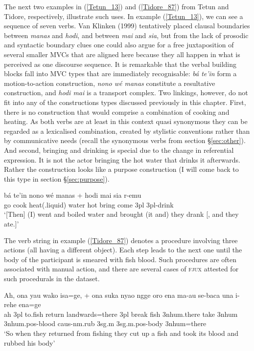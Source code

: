The next two examples in (\ref{Tetun_13}) and (\ref{Tidore_87}) from Tetun and Tidore, respectively, illustrate such uses. In example (\ref{Tetun_13}), we can see a sequence of seven verbs. Van Klinken (1999) tentatively placed clausal boundaries between \textit{manas} and \textit{hodi}, and between \textit{mai} and \textit{sia}, but from the lack of prosodic and syntactic boundary clues one could also argue for a free juxtaposition of several smaller MVCs that are aligned here because they all happen in what is perceived as one discourse sequence. It is remarkable that the verbal building blocks fall into MVC types that are immediately recognisable: \textit{bá te'in} form a motion-to-action construction, \textit{nono wé manas} constitute a resultative construction, and \textit{hodi mai} is a transport complex. Two linkings, however, do not fit into any of the constructions types discussed previously in this chapter. First, there is no construction that would comprise a combination of cooking and heating. As both verbs are at least in this context quasi synonymous they can be regarded as a lexicalised combination, created by stylistic conventions rather than by communicative needs (recall the synonymous verbs from section §\ref{sec:other}). And second, bringing and drinking is special due to the change in referential expression. It is not the actor bringing the hot water that drinks it afterwards. Rather the construction looks like a purpose construction (I will come back to this type in section §\ref{sec:purpose}). 

\ea \label{Tetun_13}
\gll bá te'in nono wé manas + hodi mai sia r-emu \\
go cook heat(.liquid) water hot bring come 3\acs{pl} 3\acs{pl}-drink \\
\glft `[Then] (I) went and boiled water and brought (it and) they drank [, and they ate.]' \\ 
\z
\xe

The verb string in example (\ref{Tidore_87}) denotes a procedure involving three actions (all having a different object). Each step leads to the next one until the body of the participant is smeared with fish blood. Such procedures are often associated with manual action, and there are several cases of \textsc{fjux} attested for such procedurals in the dataset.

\ea \label{Tidore_87}
\gll Ah, ona yau wako isa=ge, + ona suka nyao ngge oro ena ma-au se-baca una i-rehe ena=ge \\
ah 3\acs{pl} to.fish return landwards=there 3\acs{pl} break fish 3\acs{nhum}.there take 3\acs{nhum} 3\acs{nhum}.\acs{pos}-blood \acs{caus}-\acs{nm}.rub 3\acs{sg}.\acs{m} 3\acs{sg}.\acs{m}.\acs{pos}-body 3\acs{nhum}=there \\
\glft ‘So when they returned from fishing they cut up a fish and took its blood and rubbed his body’ \\ 
\z
\xe

